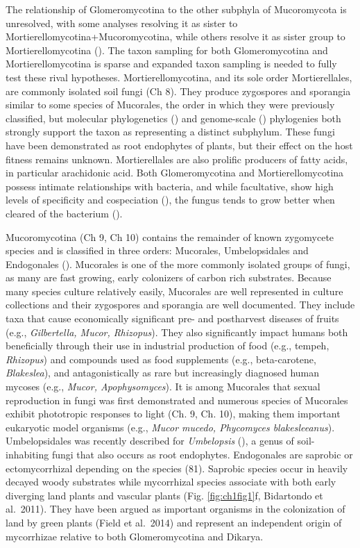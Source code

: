 \documentclass[]{book}
\begin{document}
The relationship of Glomeromycotina to the other subphyla of Mucoromycota is unresolved, with some analyses resolving it as sister to Mortierellomycotina+Mucoromycotina, while others resolve it as sister group to Mortierellomycotina (\citet{Spatafora_2016}). The taxon sampling for both Glomeromycotina and Mortierellomycotina is sparse and expanded taxon sampling is needed to fully test these rival hypotheses. Mortierellomycotina, and its sole order Mortierellales, are commonly isolated soil fungi (Ch 8). They produce zygospores and sporangia similar to some species of Mucorales, the order in which they were previously classified, but molecular phylogenetics (\citet{Hoffmann_2011}) and genome-scale (\citet{Spatafora_2016}) phylogenies both strongly support the taxon as representing a distinct subphylum. These fungi have been demonstrated as root endophytes of plants, but their effect on the host fitness remains unknown. Mortierellales are also prolific producers of fatty acids, in particular arachidonic acid. Both Glomeromycotina and Mortierellomycotina possess intimate relationships with bacteria, and while facultative, show high levels of specificity and cospeciation (\citet{Bonfante_2017}), the fungus tends to grow better when cleared of the bacterium (\citet{Uehling_2017}).

Mucoromycotina (Ch 9, Ch 10) contains the remainder of known zygomycete species and is classified in three orders: Mucorales, Umbelopsidales and Endogonales (\citet{Spatafora_2016}). Mucorales is one of the more commonly isolated groups of fungi, as many are fast growing, early colonizers of carbon rich substrates. Because many species culture relatively easily, Mucorales are well represented in culture collections and their zygospores and sporangia are well documented. They include taxa that cause economically significant pre- and postharvest diseases of fruits (e.g., \emph{Gilbertella, Mucor, Rhizopus}). They also significantly impact humans both beneficially through their use in industrial production of food (e.g., tempeh, \emph{Rhizopus}) and compounds used as food supplements (e.g., beta-carotene, \emph{Blakeslea}), and antagonistically as rare but increasingly diagnosed human mycoses (e.g., \emph{Mucor, Apophysomyces}). It is among Mucorales that sexual reproduction in fungi was first demonstrated and numerous species of Mucorales exhibit phototropic responses to light (Ch. 9, Ch. 10), making them important eukaryotic model organisms (e.g., \emph{Mucor mucedo, Phycomyces blakesleeanus}). Umbelopsidales was recently described for \emph{Umbelopsis }(\citet{Spatafora_2016}), a genus of soil-inhabiting fungi that also occurs as root endophytes. Endogonales are saprobic or ectomycorrhizal depending on the species (81). Saprobic species occur in heavily decayed woody substrates while mycorrhizal species associate with both early diverging land plants and vascular plants (Fig. \ref{fig:ch1fig1}f, Bidartondo et al.~2011). They have been argued as important organisms in the colonization of land by green plants (Field et al.~2014) and represent an independent origin of mycorrhizae relative to both Glomeromycotina and Dikarya.
\end{document}
